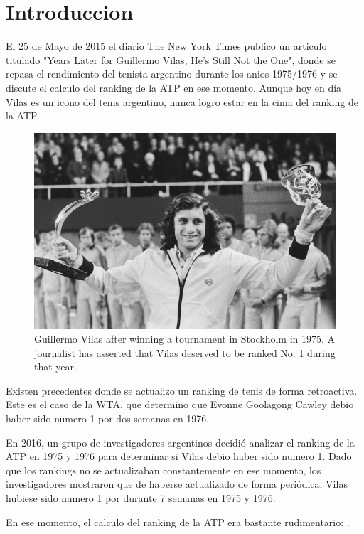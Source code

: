 \section{Introduccion}

El 25 de Mayo de 2015 el diario The New York Times publico un articulo titulado "Years Later for Guillermo Vilas, He’s Still Not the One", donde se repasa el rendimiento del tenista argentino durante los anios 1975/1976 y se discute el calculo del ranking de la ATP en ese momento. Aunque hoy en día Vilas es un icono del tenis argentino, nunca logro estar en la cima del ranking de la ATP.

\begin{figure}[H]
  \centering
  \includegraphics[scale=6]{images/nyt}
  \caption{Guillermo Vilas after winning a tournament in Stockholm in 1975. A journalist has asserted that Vilas deserved to be ranked No. 1 during that year. }
\end{figure}

Existen precedentes donde se actualizo un ranking de tenis de forma retroactiva. Este es el caso de la WTA, que determino que Evonne Goolagong Cawley debio haber sido numero 1 por dos semanas en 1976.

En 2016, un grupo de investigadores argentinos decidió analizar el ranking de la ATP en 1975 y 1976 para determinar si Vilas debio haber sido numero 1. Dado que los rankings no se actualizaban constantemente en ese momento, los investigadores mostraron que de haberse actualizado de forma periódica, Vilas hubiese sido numero 1 por durante 7 semanas en 1975 y 1976.

En ese momento, el calculo del ranking de la ATP era bastante rudimentario:  \cite{nyt}.

